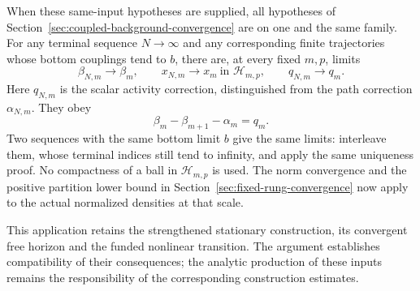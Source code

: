 When these same-input hypotheses are supplied, all hypotheses of
Section~\ref{sec:coupled-background-convergence} are on one and the
same family. For any terminal sequence
$N\to\infty$ and any corresponding finite trajectories whose bottom
couplings tend to $b$, there are, at every fixed $m,p$, limits
\[
 \beta_{N,m}\longrightarrow\beta_m,\qquad
 x_{N,m}\longrightarrow x_m\ \text{in }\mathcal H_{m,p},\qquad
 q_{N,m}\longrightarrow q_m.
\]
Here $q_{N,m}$ is the scalar activity correction, distinguished from
the path correction $\alpha_{N,m}$. They obey
\[
                \beta_m-\beta_{m+1}-\alpha_m=q_m.
\]
Two sequences with the same bottom limit $b$ give the same limits:
interleave them, whose terminal indices still tend to infinity,
and apply the same uniqueness proof. No compactness of a ball in
$\mathcal H_{m,p}$ is used. The norm convergence and the positive
partition lower bound in Section~\ref{sec:fixed-rung-convergence}
now apply to the actual normalized densities at that scale.

This application retains the strengthened stationary construction,
its convergent free horizon and the funded nonlinear transition.
The argument establishes compatibility of their consequences; the
analytic production of these inputs remains the responsibility of
the corresponding construction estimates.
